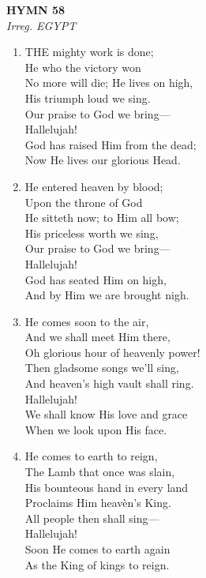 \documentclass[11pt,a4paper]{article}
\begin{document}
\newpage
\begin{center}
    {\Large \textbf{HYMN 58}}
    \\
    \textit{Irreg. EGYPT}
\end{center}
\vspace{1em}

\begin{enumerate}
    \item THE mighty work is done; \\
        He who the victory won \\
        No more will die; He lives on high, \\
        His triumph loud we sing. \\
        Our praise to God we bring--- \\
        Hallelujah! \\
        God has raised Him from the dead; \\
        Now He lives our glorious Head.

    \item He entered heaven by blood; \\
        Upon the throne of God \\
        He sitteth now; to Him all bow; \\
        His priceless worth we sing, \\
        Our praise to God we bring--- \\
        Hallelujah! \\
        God has seated Him on high, \\
        And by Him we are brought nigh.

    \item He comes soon to the air, \\
        And we shall meet Him there, \\
        Oh glorious hour of heavenly power! \\
        Then gladsome songs we'll sing, \\
        And heaven's high vault shall ring. \\
        Hallelujah! \\
        We shall know His love and grace \\
        When we look upon His face.

    \item He comes to earth to reign, \\
        The Lamb that once was slain, \\
        His bounteous hand in every land \\
        Proclaims Him heav\`en's King. \\
        All people then shall sing--- \\
        Hallelujah! \\
        Soon He comes to earth again \\
        As the King of kings to reign.

\end{enumerate}
\end{document}
